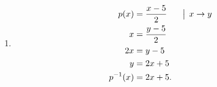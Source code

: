 \documentclass[11pt,a4paper]{article}
\begin{document}
\begin{zadaniReseniBox}[title={Domácí úkol}]
\begin{enumerate}[label=\alph*)]
\item \[\begin{aligned}p(x)&=\frac{x-5}{2}&&\bigm|\,x\to y\\x&=\frac{y-5}{2}\\2x&=y-5\\y&=2x+5\\p^{-1}(x)&=2x+5.\end{aligned}\]
\end{enumerate}
\end{zadaniReseniBox}
\end{document}
